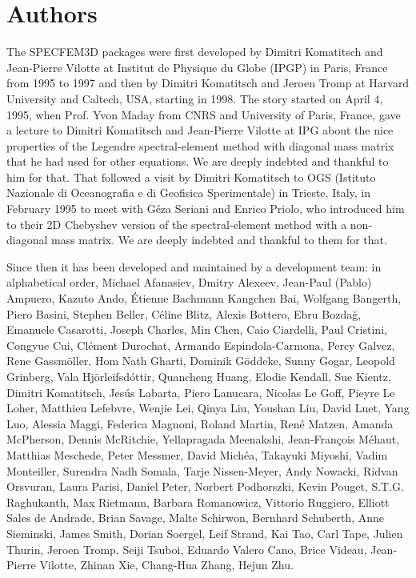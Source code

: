 \section*{Authors}

\noindent The SPECFEM3D packages were first developed by Dimitri
Komatitsch and Jean-Pierre Vilotte at Institut de Physique du Globe
(IPGP) in Paris, France from 1995 to 1997 and then by Dimitri Komatitsch
and Jeroen Tromp at Harvard University and Caltech, USA, starting in 1998.
The story started on April 4, 1995, when Prof. Yvon Maday from CNRS and University of Paris, France, gave a lecture to
Dimitri Komatitsch and Jean-Pierre Vilotte at IPG about the nice properties of the Legendre spectral-element method with diagonal mass matrix that he had used for
other equations. We are deeply indebted and thankful to him for that.
That followed a visit by Dimitri Komatitsch to OGS (Istituto Nazionale di Oceanografia e di Geofisica Sperimentale) in Trieste, Italy, in February 1995
to meet with G\'eza Seriani and Enrico Priolo, who introduced him to their 2D Chebyshev version of the spectral-element method with a non-diagonal mass matrix.
We are deeply indebted and thankful to them for that.\newline

Since then it has been developed and maintained by a development team: in alphabetical order,
Michael Afanasiev,
Dmitry Alexeev,
Jean-Paul (Pablo) Ampuero,
Kazuto Ando,
\'Etienne Bachmann
Kangchen Bai,
Wolfgang Bangerth,
Piero Basini,
Stephen Beller,
C\'eline Blitz,
Alexis Bottero,
Ebru Bozda\u{g},
Emanuele Casarotti,
Joseph Charles,
Min Chen,
Caio Ciardelli,
Paul Cristini,
Congyue Cui,
Cl\'ement Durochat,
Armando Espindola-Carmona,
Percy Galvez,
Rene Gassm\"oller,
Hom Nath Gharti,
Dominik G\"oddeke,
Sunny Gogar,
Leopold Grinberg,
Vala Hj\"orleifsd\'ottir,
Quancheng Huang,
Elodie Kendall,
Sue Kientz,
Dimitri Komatitsch,
Jes\'us Labarta,
Piero Lanucara,
Nicolas Le Goff,
Pieyre Le Loher,
Matthieu Lefebvre,
Wenjie Lei,
Qinya Liu,
Youshan Liu,
David Luet,
Yang Luo,
Alessia Maggi,
Federica Magnoni,
Roland Martin,
Ren\'e Matzen,
Amanda McPherson,
Dennis McRitchie,
Yellapragada Meenakshi,
Jean-Fran\c{c}ois M\'ehaut,
Matthias Meschede,
Peter Messmer,
David Mich\'ea,
Takayuki Miyoshi,
Vadim Monteiller,
Surendra Nadh Somala,
Tarje Nissen-Meyer,
Andy Nowacki,
Ridvan Orsvuran,
Laura Parisi,
Daniel Peter,
Norbert Podhorszki,
Kevin Pouget,
S.T.G. Raghukanth,
Max Rietmann,
Barbara Romanowicz,
Vittorio Ruggiero,
Elliott Sales de Andrade,
Brian Savage,
Malte Schirwon,
Bernhard Schuberth,
Anne Sieminski,
James Smith,
Dorian Soergel,
Leif Strand,
Kai Tao,
Carl Tape,
Julien Thurin,
Jeroen Tromp,
Seiji Tsuboi,
Eduardo Valero Cano,
Brice Videau,
Jean-Pierre Vilotte,
Zhinan Xie,
Chang-Hua Zhang,
Hejun Zhu.\newline


